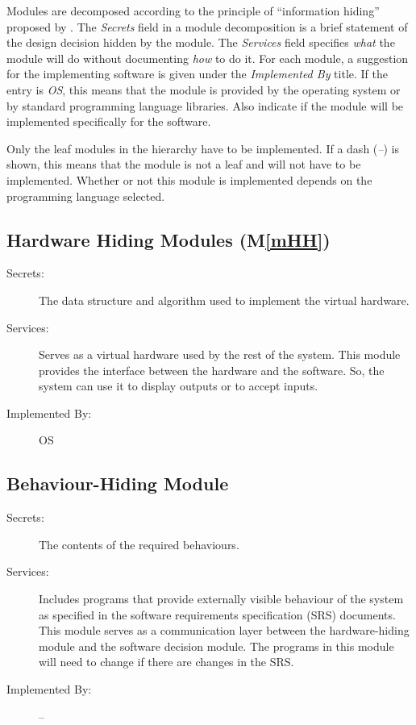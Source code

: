 \documentclass[12pt, titlepage]{article}
\newcommand{\mref}[1]{M\ref{#1}}
\begin{document}
Modules are decomposed according to the principle of ``information hiding''
proposed by \citet{ParnasEtAl1984}. The \emph{Secrets} field in a module
decomposition is a brief statement of the design decision hidden by the
module. The \emph{Services} field specifies \emph{what} the module will do
without documenting \emph{how} to do it. For each module, a suggestion for the
implementing software is given under the \emph{Implemented By} title. If the
entry is \emph{OS}, this means that the module is provided by the operating
system or by standard programming language libraries.  Also indicate if the
module will be implemented specifically for the software.

Only the leaf modules in the
hierarchy have to be implemented. If a dash (\emph{--}) is shown, this means
that the module is not a leaf and will not have to be implemented. Whether or
not this module is implemented depends on the programming language
selected.

\subsection{Hardware Hiding Modules (\mref{mHH})}

\begin{description}
\item[Secrets:]The data structure and algorithm used to implement the virtual
  hardware.
\item[Services:]Serves as a virtual hardware used by the rest of the
  system. This module provides the interface between the hardware and the
  software. So, the system can use it to display outputs or to accept inputs.
\item[Implemented By:] OS
\end{description}

\subsection{Behaviour-Hiding Module}

\begin{description}
\item[Secrets:]The contents of the required behaviours.
\item[Services:]Includes programs that provide externally visible behaviour of
  the system as specified in the software requirements specification (SRS)
  documents. This module serves as a communication layer between the
  hardware-hiding module and the software decision module. The programs in this
  module will need to change if there are changes in the SRS.
\item[Implemented By:] --
\end{description}
\end{document}
